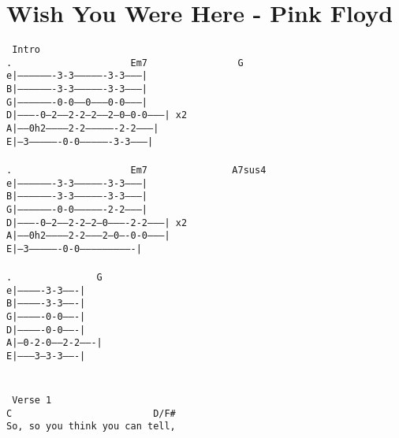 \newpage
\section{Wish You Were Here - Pink Floyd}
\label{Wish You Were Here - Pink Floyd}
\texttt{\lbrack\ Intro\rbrack\\
. \ \ \ \ \ \ \ \ \ \ \ \ \ \ \ \ \ \ \ \ Em7\ \ \ \ \ \ \ \ \ \ \ \ \ \ \ \ G\\
e|-------------------3-3----------------3-3---------|\\
B|-------------------3-3----------------3-3---------|\\
G|-------------------0-0------0---------0-0---------|\\
D|----------0--2-----2-2---2-----2--0---0-0---------|\ x2\\
A|-----0h2-----------2-2----------------2-2---------|\\
E|--3----------------0-0----------------3-3---------|\\
\\
. \ \ \ \ \ \ \ \ \ \ \ \ \ \ \ \ \ \ \ \ Em7\ \ \ \ \ \ \ \ \ \ \ \ \ \ \ A7sus4\\
e|-------------------3-3----------------3-3---------|\\
B|-------------------3-3----------------3-3---------|\\
G|-------------------0-0----------------2-2---------|\\
D|----------0--2-----2-2--2--0----------2-2---------|\ x2\\
A|-----0h2-----------2-2--------2--0----0-0---------|\\
E|--3----------------0-0----------------------------|\\
\\
. \ \ \ \ \ \ \ \ \ \ \ \ \ \ G\\
e|-------------3-3-------|\\
B|-------------3-3-------|\\
G|-------------0-0-------|\\
D|-------------0-0-------|\\
A|--0-2-0------2-2-------|\\
E|---------3---3-3-------|\\
\\
\\
\lbrack\ Verse\ 1\rbrack\\
C\ \ \ \ \ \ \ \ \ \ \ \ \ \ \ \ \ \ \ \ \ \ \ \ \ D/F\#\\
So,\ so\ you\ think\ you\ can\ tell,\\
}
